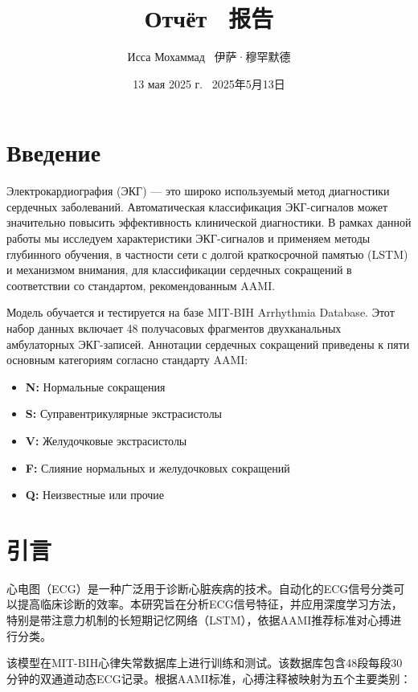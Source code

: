 \documentclass{article}
\title{Отчёт  \ \large 报告}
\author{Исса Мохаммад \ 伊萨·穆罕默德}
\date{13 мая 2025 г. \ 2025年5月13日}
\providecommand{\pcsync}{\par\vspace{\baselineskip}}
\begin{document}
\maketitle

\begin{paracol}{2}
\setlength{\columnsep}{20pt}
\setlength{\emergencystretch}{3em}

\section{Введение}
\pcsync
Электрокардиография (ЭКГ) — это широко используемый метод диагностики сердечных заболеваний. Автоматическая классификация ЭКГ-сигналов может значительно повысить эффективность клинической диагностики. В рамках данной работы мы исследуем характеристики ЭКГ-сигналов и применяем методы глубинного обучения, в частности сети с долгой краткосрочной памятью (LSTM) и механизмом внимания, для классификации сердечных сокращений в соответствии со стандартом, рекомендованным AAMI.

Модель обучается и тестируется на базе MIT-BIH Arrhythmia Database. Этот набор данных включает 48 получасовых фрагментов двухканальных амбулаторных ЭКГ-записей. Аннотации сердечных сокращений приведены к пяти основным категориям согласно стандарту AAMI:

\begin{itemize}
    \item \textbf{N:} Нормальные сокращения
    \item \textbf{S:} Суправентрикулярные экстрасистолы
    \item \textbf{V:} Желудочковые экстрасистолы
    \item \textbf{F:} Слияние нормальных и желудочковых сокращений
    \item \textbf{Q:} Неизвестные или прочие
\end{itemize}

\switchcolumn

\section{引言}
\pcsync
心电图（ECG）是一种广泛用于诊断心脏疾病的技术。自动化的ECG信号分类可以提高临床诊断的效率。本研究旨在分析ECG信号特征，并应用深度学习方法，特别是带注意力机制的长短期记忆网络（LSTM），依据AAMI推荐标准对心搏进行分类。

该模型在MIT-BIH心律失常数据库上进行训练和测试。该数据库包含48段每段30分钟的双通道动态ECG记录。根据AAMI标准，心搏注释被映射为五个主要类别：


\end{paracol}
\end{document}

